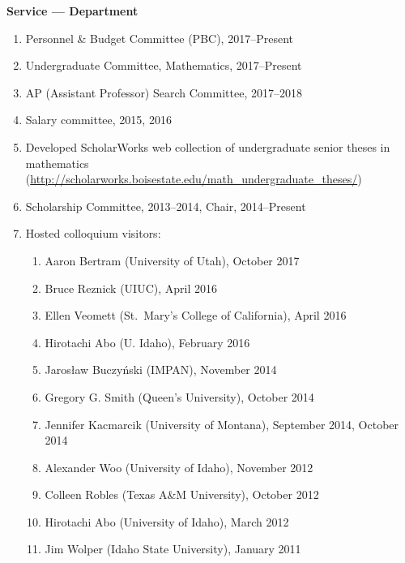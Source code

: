 \documentclass[12pt]{article}
\begin{document}
\textbf{Service --- Department}
\begin{enumerate}

\item Personnel \& Budget Committee (PBC), 2017--Present

\item Undergraduate Committee, Mathematics, 2017--Present

\item AP (Assistant Professor) Search Committee, 2017--2018

\item Salary committee, 2015, 2016

\item Developed ScholarWorks web collection of undergraduate senior theses in mathematics
(\url{http://scholarworks.boisestate.edu/math_undergraduate_theses/})


\item Scholarship Committee, 2013--2014, Chair, 2014--Present

\item Hosted colloquium visitors:
\begin{enumerate}
\item Aaron Bertram (University of Utah), October 2017
\item Bruce Reznick (UIUC), April 2016
\item Ellen Veomett (St.\ Mary's College of California), April 2016
\item Hirotachi Abo (U. Idaho), February 2016
\item Jaros{\l}aw Buczy\'nski (IMPAN), November 2014
\item Gregory G. Smith (Queen's University), October 2014
\item Jennifer Kacmarcik (University of Montana), September 2014, October 2014 %
\item Alexander Woo (University of Idaho), November 2012
\item Colleen Robles (Texas A\&M University), October 2012
\item Hirotachi Abo (University of Idaho), March 2012
\item Jim Wolper (Idaho State University), January 2011
\end{enumerate}


\end{enumerate}
\end{document}

